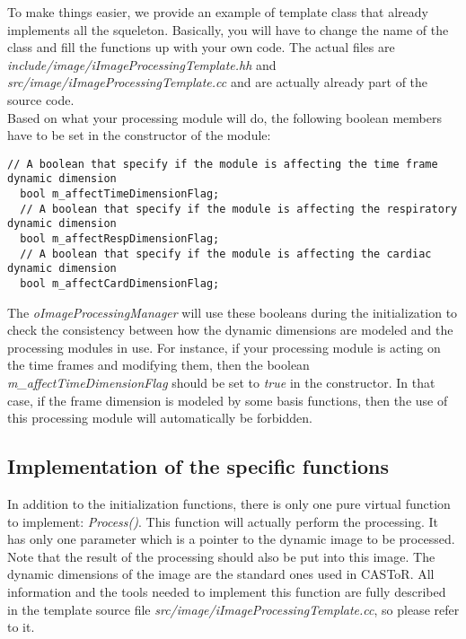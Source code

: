 \documentclass[a4paper, 11pt]{article}
\begin{document}
To make things easier, we provide an example of template class that already implements all the squeleton. Basically, you will have to change the name of the class
and fill the functions up with your own code. The actual files are \textit{include/image/iImageProcessingTemplate.hh} and \textit{src/image/iImageProcessingTemplate.cc}
and are actually already part of the source code.\\

Based on what your processing module will do, the following boolean members have to be set in the constructor of the module:

\begin{lstlisting}[label={Boolean members},caption={Boolean members specifying the actions of the module on the different dynamic dimensions.}]
  // A boolean that specify if the module is affecting the time frame dynamic dimension
  bool m_affectTimeDimensionFlag;
  // A boolean that specify if the module is affecting the respiratory dynamic dimension
  bool m_affectRespDimensionFlag;
  // A boolean that specify if the module is affecting the cardiac dynamic dimension
  bool m_affectCardDimensionFlag;
\end{lstlisting}

The \textit{oImageProcessingManager} will use these booleans during the initialization to check the consistency between how the dynamic dimensions are modeled and the
processing modules in use. For instance, if your processing module is acting on the time frames and modifying them, then the boolean \textit{m\_affectTimeDimensionFlag}
should be set to \textit{true} in the constructor. In that case, if the frame dimension is modeled by some basis functions, then the use of this processing module will
automatically be forbidden.

\subsection{Implementation of the specific functions}

In addition to the initialization functions, there is only one pure virtual function to implement: \textit{Process()}. This function will actually perform the processing.
It has only one parameter which is a pointer to the dynamic image to be processed. Note that the result of the processing should also be put into this image. The dynamic
dimensions of the image are the standard ones used in CASToR. All information and the tools needed to implement this function are fully described in the template source
file \textit{src/image/iImageProcessingTemplate.cc}, so please refer to it.\\
\end{document}
